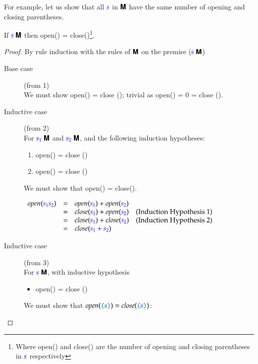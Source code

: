 \documentclass{book}
\begin{document}
For example, let us show that all $\textcolor{blue}{s}$ in $\textsf{\textbf{M}}$ have the same number of opening and
closing parentheses.
\begin{theorem} 
  If ${\textcolor{blue}{s}}\;\textsf{\textbf{M}}$ then \<open() = close()\>\footnote{Where
    \<open()\> and \<close()\> are the number of opening and 
    closing parentheses in $\textcolor{blue}{s}$ respectively}.
  \begin{proof}  By rule induction with the rules of $\textsf{\textbf{M}}$ on the premise (${\textcolor{blue}{s}}\;\textsf{\textbf{M}}$)
\begin{description}
\item[Base case] (from 1) \\ We must show \<open(\conc{\epsilon}) = close
  (\conc{\epsilon})\>; trivial as \<open(\conc{\epsilon}) = 0 = close (\conc{\epsilon})\>.

\item[Inductive case] (from 2) \\ For ${\textcolor{blue}{s_1}}\;\textsf{\textbf{M}}$ and ${\textcolor{blue}{s_2}}\;\textsf{\textbf{M}}$,
  and the following induction hypotheses:
  \begin{enumerate}
    \item \< \implies open() = close ()\>

    \item \< \implies open() = close ()\>
  \end{enumerate}
  We must show that \<open() = close()\>. 

    $\begin{array}{lclr}
    \mathit{open}(\textcolor{blue}{s_1 s_2}) & = & \mathit{open}(\textcolor{blue}{s_1}) + \mathit{open} (\textcolor{blue}{s_2}) & \\ 
                                  & = & \mathit{close}(\textcolor{blue}{s_1}) + \mathit{open} (\textcolor{blue}{s_2}) & \text{(Induction Hypothesis 1)}\\
                                  & = & \mathit{close}(\textcolor{blue}{s_1}) + \mathit{close} (\textcolor{blue}{s_2}) & \text{(Induction Hypothesis 2)}\\
                                  & = & \mathit{close} (\textcolor{blue}{s_1 + s_2})\> \end{array}$
  
\item[Inductive case] (from 3)\\
For ${\textcolor{blue}{s}}\;\textsf{\textbf{M}}$, with inductive hypothesis 
  \begin{itemize}
  \item \< \implies open() = close ()\>
  \end{itemize}
  We must show that $\mathit{open}(\mconc{(}\meta{s}\mconc{)}) =
  \mathit{close}(\mconc{(}\meta{s}\mconc{)})$:


\end{description}
\end{proof}
\end{theorem}
\end{document}
